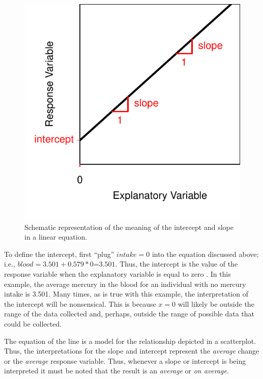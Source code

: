 \documentclass[10pt,openany]{book}\usepackage[]{graphicx}\usepackage[]{color}
\newenvironment{knitrout}{}{} %
\begin{document}
\begin{knitrout}
\color{fgcolor}\begin{figure}[hbtp]

{\centering \includegraphics[width=.4\linewidth]{Figs/SlopeInt-1} 

}

\caption[Schematic representation of the meaning of the intercept and slope in a linear equation]{Schematic representation of the meaning of the intercept and slope in a linear equation.}\label{fig:SlopeInt}
\end{figure}


\end{knitrout}

To define the intercept, first ``plug'' $intake=0$ into the equation discussed above; i.e., $blood=3.501+0.579*0$=$3.501$.  Thus, the intercept is the value of the response variable when the explanatory variable is equal to zero .  In this example, the average mercury in the blood for an individual with no mercury intake is 3.501.  Many times, as is true with this example, the interpretation of the intercept will be nonsensical.  This is because $x=0$ will likely be outside the range of the data collected and, perhaps, outside the range of possible data that could be collected.

The equation of the line is a model for the relationship depicted in a scatterplot.  Thus, the interpretations for the slope and intercept represent the \textit{average} change or the \textit{average} response variable.  Thus, whenever a slope or intercept is being interpreted it must be noted that the result is an \textit{average} or \textit{on average}.


\vspace{-12pt}
\end{document}
